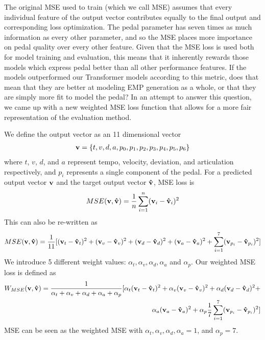 The original MSE used to train \vnet{} (which we call \vnet{} MSE) assumes that every individual feature of the output vector contributes equally to the final output and corresponding loss optimization. The pedal parameter has seven times as much information as every other parameter, and so the \vnetf{} MSE places more importance on pedal quality over every other feature. Given that the \vnetf{} MSE loss is used both for model training and evaluation, this means that it inherently rewards those models which express pedal better than all other performance features. If the \vnet{} models outperformed our Transformer models according to this metric, does that mean that they are better at modeling EMP generation as a whole, or that they are simply more fit to model the pedal? In an attempt to answer this question, we came up with a new weighted MSE loss function that allows for a more fair representation of the evaluation method. 

\newcommand{\rvec}[1]{\mb{#1}}

\newcommand{\vn}{\rvec{v}}
\newcommand{\vh}{\rvec{\hat{v}}}

\newcommand{\df}[1]{(\vn_{#1} - \vh_{#1})^2}

\newcommand{\al}[1]{\alpha_{#1}}

We define the output vector as an 11 dimensional vector 
\begin{align*}
\rvec{v} = \{t, v, d, a, p_0, p_1, p_2, p_3, p_4, p_5, p_6\}   
\end{align*}
where $t$, $v$, $d$, and $a$ represent tempo, velocity, deviation, and articulation respectively, and $p_i$ represents a single component of the pedal. For a predicted output vector $\vn$ and the target output vector $\vh$, \vnetf{} MSE loss is 
\begin{align*}
MSE(\vn, \vh) = \frac{1}{n}\sum_{i=1}^{n}(\vn_i - \vh_i)^2   
\end{align*}
This can also be re-written as 
\begin{align*}
MSE(\vn, \vh) = \frac{1}{11}[\df{t} + \df{v} + \df{d} + \df{a} + \sum_{i=1}^{7}(\vn_{p_{i}} - \vh_{p_{i}})^2]   
\end{align*}
We introduce 5 different weight values: $\al{t}, \al{v}, \al{d}, \al{a}$ and $\al{p}$. Our weighted MSE loss is defined as 
\begin{align*}
W_{MSE}(\vn, \vh) = \frac{1}{\al{t} + \al{v} + \al{d} + \al{a} + \al{p}}[\al{t}\df{t} + \al{v}\df{v} + \al{d}\df{d} + \\
\al{a}\df{a} + \al{p}\frac{1}{7}\sum_{i=1}^{7}(\vn_{p_{i}} - \vh_{p_{i}})^2 ]   
\end{align*}
\vnetf{} MSE can be seen as the weighted MSE with $\al{t}, \al{v}, \al{d}, \al{a} = 1$, and $\al{p} = 7$. 

